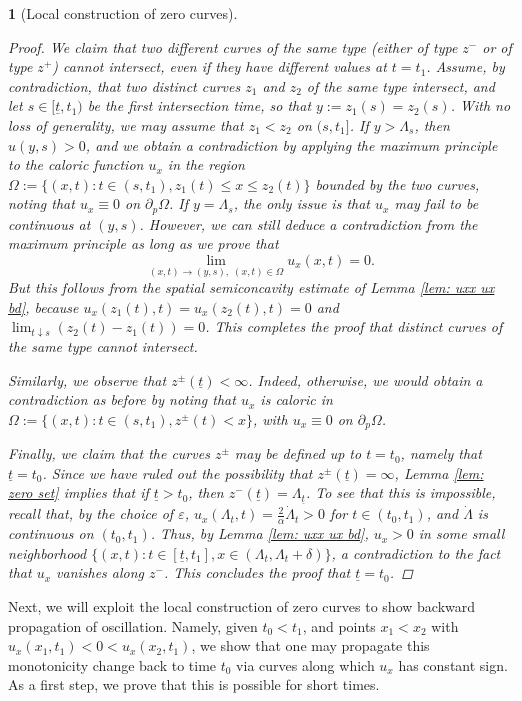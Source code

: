 \documentclass{article}
\numberwithin{equation}{section}
\numberwithin{figure}{section}
\theoremstyle{plain}
\theoremstyle{plain}
\theoremstyle{plain}
\theoremstyle{plain}
\newtheorem{lem}[thm]{\protect\lemmaname}
\theoremstyle{definition}
\theoremstyle{remark}
\def\vep{\varepsilon}
\providecommand{\lemmaname}{Lemma}
\begin{document}
\begin{lem}[Local construction of zero curves]
\begin{proof}
We claim that two different curves of the same type (either of type $z^-$ or of type $z^+$) cannot intersect, even if they have different values at $t=t_1$. Assume, by contradiction, that two distinct curves $z_1$ and $z_2$ of the same type intersect, and let $s\in [\underline{t},t_1)$ be the first intersection time, so that $y:=z_1(s)=z_2(s)$. With no loss of generality, we may assume that $z_1< z_2$ on $(s,t_1]$. If $y>\Lambda_s$, then $u(y,s)>0$, and we obtain a contradiction by applying the maximum principle to the caloric function $u_x$ in the region $\Omega:=\{(x,t):t\in (s,t_1), z_1(t)\leq x \leq z_2(t)\}$ bounded by the two curves, noting that $u_x\equiv 0$ on $\partial_{p}\Omega$. If $y=\Lambda_s$, the only issue is that $u_x$ may fail to be continuous at $(y,s)$. However, we can still deduce a contradiction from the maximum principle as long as we prove that
\begin{equation}
    \lim_{(x,t)\to (y,s), \;(x,t)\in \Omega} u_x(x,t)=0.
\end{equation}
But this follows from the spatial semiconcavity estimate of Lemma \ref{lem: uxx ux bd}, because $u_x(z_1(t),t)=u_x(z_2(t),t)=0$ and $\lim_{t \downarrow s} (z_2(t)-z_1(t))=0$. This completes the proof that distinct curves of the same type cannot intersect. 

Similarly, we observe that $z^{\pm}(\underline{t})<\infty$. Indeed, otherwise, we would obtain a contradiction as before by noting that $u_x$ is caloric in $\Omega:=\{(x,t): t\in (s,t_1), z^{\pm}(t)<x\}$, with $u_x\equiv 0$ on $\partial_{p}\Omega$.

Finally, we claim that the curves $z^{\pm}$ may be defined up to $t=t_0$, namely that $\underline{t}=t_0$. Since we have ruled out the possibility that $z^{\pm}(\underline{t})=\infty$, Lemma \ref{lem: zero set} implies that if $\underline{t}>t_0$, then $z^-(\underline{t})=\Lambda_{\underline{t}}$. To see that this is impossible, recall that, by the choice of $\vep$, $u_x(\Lambda_t,t)=\frac{2}{\alpha}\dot\Lambda_t>0$ for $t\in (t_0,t_1)$, and $\dot \Lambda$ is continuous on $(t_0,t_1)$. Thus, by Lemma \ref{lem: uxx ux bd}, $u_x>0$ in some small neighborhood $\{(x,t):t\in [\underline{t},t_1], x\in (\Lambda_{t},\Lambda_t+\delta)\}$, a contradiction to the fact that $u_x$ vanishes along $z^-$. This concludes the proof that $\underline{t}=t_0$.
\end{proof}
\end{lem}
Next, we will exploit the local construction of zero curves to show backward propagation of oscillation. Namely, given $t_0<t_1$, and points $x_1<x_2$ with $u_x(x_1,t_1)<0<u_x(x_2,t_1)$, we show that one may propagate this monotonicity change back to time $t_0$ via curves along which $u_x$ has constant sign. As a first step, we prove that this is possible for short times.
\end{document}
